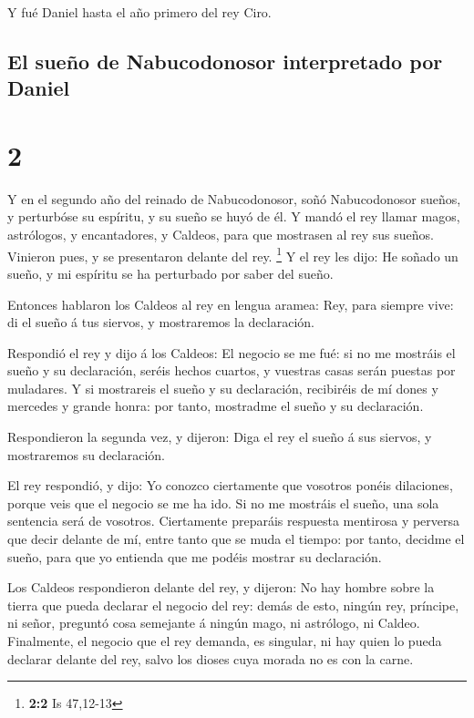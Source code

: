  Y fué Daniel hasta el año primero del rey Ciro.

\hypertarget{el-sueuxf1o-de-nabucodonosor-interpretado-por-daniel}{%
\subsection{El sueño de Nabucodonosor interpretado por
Daniel}\label{el-sueuxf1o-de-nabucodonosor-interpretado-por-daniel}}

\hypertarget{section-1}{%
\section{2}\label{section-1}}

 Y en el segundo año del reinado de Nabucodonosor, soñó
Nabucodonosor sueños, y perturbóse su espíritu, y su sueño se huyó de
él.  Y mandó el rey llamar magos, astrólogos, y
encantadores, y Caldeos, para que mostrasen al rey sus sueños. Vinieron
pues, y se presentaron delante del rey. \footnote{\textbf{2:2} Is
  47,12-13}  Y el rey les dijo: He soñado un sueño, y mi
espíritu se ha perturbado por saber del sueño.

 Entonces hablaron los Caldeos al rey en lengua aramea: Rey,
para siempre vive: di el sueño á tus siervos, y mostraremos la
declaración.

 Respondió el rey y dijo á los Caldeos: El negocio se me
fué: si no me mostráis el sueño y su declaración, seréis hechos cuartos,
y vuestras casas serán puestas por muladares.  Y si
mostrareis el sueño y su declaración, recibiréis de mí dones y mercedes
y grande honra: por tanto, mostradme el sueño y su declaración.

 Respondieron la segunda vez, y dijeron: Diga el rey el
sueño á sus siervos, y mostraremos su declaración.

 El rey respondió, y dijo: Yo conozco ciertamente que
vosotros ponéis dilaciones, porque veis que el negocio se me ha ido.
 Si no me mostráis el sueño, una sola sentencia será de
vosotros. Ciertamente preparáis respuesta mentirosa y perversa que decir
delante de mí, entre tanto que se muda el tiempo: por tanto, decidme el
sueño, para que yo entienda que me podéis mostrar su declaración.

 Los Caldeos respondieron delante del rey, y dijeron: No
hay hombre sobre la tierra que pueda declarar el negocio del rey: demás
de esto, ningún rey, príncipe, ni señor, preguntó cosa semejante á
ningún mago, ni astrólogo, ni Caldeo.  Finalmente, el
negocio que el rey demanda, es singular, ni hay quien lo pueda declarar
delante del rey, salvo los dioses cuya morada no es con la carne.

